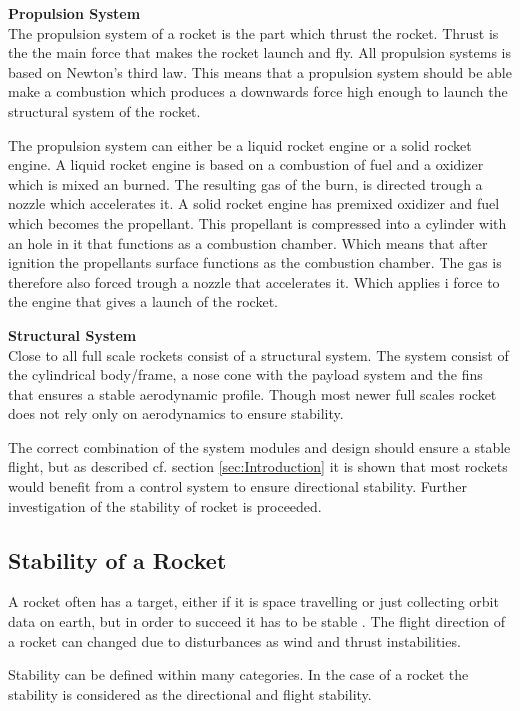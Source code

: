 \textbf{Propulsion System}\\
The propulsion system of a rocket is the part which thrust the rocket. Thrust is the the main force that makes the rocket launch and fly. All propulsion systems is based on Newton's third law. This means that a propulsion system should be able make a combustion which produces a downwards force high enough to launch the structural system of the rocket.


The propulsion system can either be a liquid rocket engine or a solid rocket engine. A liquid rocket engine is based on a combustion of fuel and a oxidizer which is mixed an burned. The resulting gas of the burn, is directed trough a nozzle which accelerates it.
A solid rocket engine has premixed oxidizer and fuel which becomes the propellant. This propellant is compressed into a cylinder with an hole in it that functions as a combustion chamber. Which means that after ignition the propellants surface functions as the combustion chamber. The gas is therefore also forced trough a nozzle that accelerates it. Which applies i force to the engine that gives a launch of the rocket. 


\textbf{Structural System}\\
Close to all full scale rockets consist of a structural system. The system consist of the cylindrical body/frame, a nose cone with the payload system and the fins that ensures a stable aerodynamic profile. Though most newer full scales rocket does not rely only on aerodynamics to ensure stability\cite{web:RocketStructure}.


The correct combination of the system modules and design should ensure a stable flight, but as described cf. section \ref{sec:Introduction} it is shown that most rockets would benefit from a control system to ensure directional stability. Further investigation of the stability of rocket is proceeded. 


\subsection{Stability of a Rocket}
\graphicspath{{figures/"Preanalysis&Requirement"/RocketStability/}}
A rocket often has a target, either if it is space travelling or just collecting orbit data on earth, but in order to succeed it has to be stable \cite{web:rocketnasa}. The flight direction of a rocket can changed due to disturbances as wind and thrust instabilities.   

Stability can be defined within many categories. In the case of a rocket the stability is considered as the directional and flight stability.  

